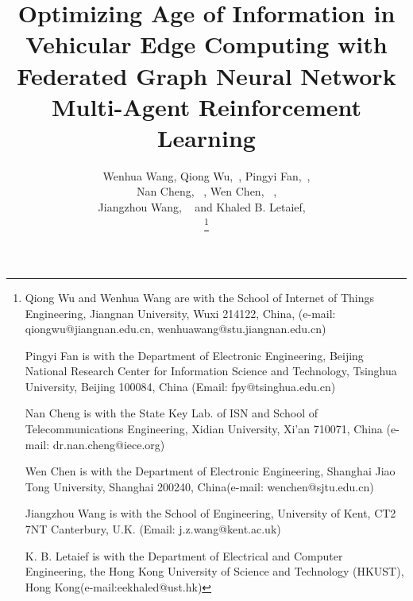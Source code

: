 \documentclass[lettersize,journal,onecolumn]{IEEEtran}
\begin{document}
\title{Optimizing Age of Information in Vehicular Edge Computing with Federated Graph Neural Network Multi-Agent Reinforcement Learning}

\author{

{
	Wenhua Wang, 
	Qiong Wu,~, 
	Pingyi Fan,~,\\ 
	Nan Cheng, ~, 
	Wen Chen, ~,\\ 
	Jiangzhou Wang, ~ 
	and Khaled B. Letaief, ~
}

\thanks{

{	Qiong Wu and Wenhua Wang are with the School of Internet of Things Engineering, Jiangnan University, Wuxi 214122, China, (e-mail: qiongwu@jiangnan.edu.cn, wenhuawang@stu.jiangnan.edu.cn)

	Pingyi Fan is with the Department of Electronic Engineering, Beijing National Research Center for Information Science and Technology, Tsinghua University, Beijing 100084, China (Email: fpy@tsinghua.edu.cn)
	
	Nan Cheng is with the State Key Lab. of ISN and School of Telecommunications Engineering, Xidian University, Xi'an 710071, China (e-mail:
		dr.nan.cheng@iece.org)
		
	Wen Chen is with the Department of Electronic Engineering, Shanghai Jiao Tong University, Shanghai 200240, China(e-mail: wenchen@sjtu.edu.cn)

	Jiangzhou Wang is with the School of Engineering, University of Kent, CT2 7NT Canterbury, U.K. (Email: j.z.wang@kent.ac.uk)

	K. B. Letaief is with the Department of Electrical and Computer Engineering, the Hong Kong University of Science and Technology (HKUST), Hong Kong(e-mail:eekhaled@ust.hk)
	
%
}

}%
}


\end{document}
